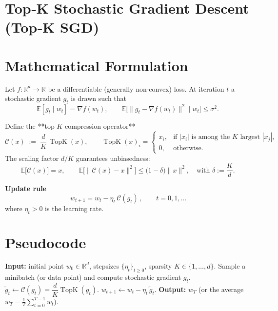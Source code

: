 \documentclass{article}
\newcommand{\E}{\mathbb{E}}
\newcommand{\R}{\mathbb{R}}
\newcommand{\TopK}{\operatorname{TopK}}
\newcommand{\C}{\mathcal{C}}
\begin{document}
\section*{Top‑K Stochastic Gradient Descent (Top‑K SGD)}

\section*{Mathematical Formulation}
Let $f:\R^{d}\rightarrow\R$ be a differentiable (generally non‑convex) loss.  
At iteration $t$ a stochastic gradient $g_t$ is drawn such that
\[
\E[g_t\mid w_t]=\nabla f(w_t),\qquad 
\E\bigl[\|g_t-\nabla f(w_t)\|^{2}\mid w_t\bigr]\le\sigma^{2}.
\]

Define the **top‑$K$ compression operator**
\[
\C(x)\;:=\;\frac{d}{K}\,\TopK(x),\qquad 
\TopK(x)_i=\begin{cases}
x_i,&\text{if }|x_i|\text{ is among the $K$ largest }|x_j|,\\
0,&\text{otherwise.}
\end{cases}
\]
The scaling factor $d/K$ guarantees unbiasedness:
\[
\E\bigl[\C(x)\bigr]=x,\qquad 
\E\bigl[\|\C(x)-x\|^{2}\bigr]\le\bigl(1-\delta\bigr)\|x\|^{2},
\quad\text{with }\delta:=\frac{K}{d}.
\]

\textbf{Update rule}
\[
\boxed{\,w_{t+1}=w_t-\eta_t\,\C(g_t)\,},\qquad t=0,1,\dots
\]
where $\eta_t>0$ is the learning rate.

\section*{Pseudocode}
\begin{algorithm}[H]
\caption{Top‑K SGD}
\begin{algorithmic}[1]
\STATE \textbf{Input:} initial point $w_0\in\R^{d}$, stepsizes $\{\eta_t\}_{t\ge0}$, sparsity $K\in\{1,\dots,d\}$.
\STATE Sample a minibatch (or data point) and compute stochastic gradient $g_t$.
\STATE $\tilde g_t \leftarrow \C(g_t)=\dfrac{d}{K}\TopK(g_t)$.
\STATE $w_{t+1}\leftarrow w_t-\eta_t\,\tilde g_t$.
\ENDFOR
\STATE \textbf{Output:} $w_T$ (or the average $\bar w_T=\tfrac1T\sum_{t=0}^{T-1}w_t$).
\end{algorithmic}
\end{algorithm}
\end{document}
